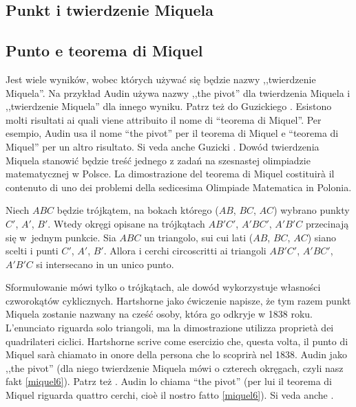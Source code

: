 
%

\subsection{Punkt i twierdzenie Miquela} %
\subsection{Punto e teorema di Miquel} %

Jest wiele wyników, wobec których używać się będzie nazwy ,,twierdzenie Miquela''. %
Na przykład Audin \cite[s. 104]{audin_2003} używa nazwy ,,the pivot'' dla twierdzenia Miquela i ,,twierdzenie Miquela'' dla innego wyniku. %
Patrz też do Guzickiego \cite[s. 29, 32]{guzicki_2021}. %
Esistono molti risultati ai quali viene attribuito il nome di ``teorema di Miquel''. %
Per esempio, Audin \cite[s. 104]{audin_2003} usa il nome “the pivot” per il teorema di Miquel e “teorema di Miquel” per un altro risultato. %
Si veda anche Guzicki \cite[p. 29, 32]{guzicki_2021}. %
%
Dowód twierdzenia Miquela stanowić będzie treść jednego z zadań na szesnastej olimpiadzie matematycznej w Polsce.%
La dimostrazione del teorema di Miquel costituirà il contenuto di uno dei problemi della sedicesima Olimpiade Matematica in Polonia.%

\begin{proposition}
[twierdzenie Miquela] %
[teorema di Miquel] %
%
Niech $ABC$ będzie trójkątem, na bokach którego ($AB$, $BC$, $AC$) wybrano punkty $C'$, $A'$, $B'$. %
Wtedy okręgi opisane na trójkątach $AB'C'$, $A'BC'$, $A'B'C$ przecinają się w~jednym punkcie. %
Sia $ABC$ un triangolo, sui cui lati ($AB$, $BC$, $AC$) siano scelti i punti $C'$, $A'$, $B'$. %
Allora i cerchi circoscritti ai triangoli $AB'C'$, $A'BC'$, $A'B'C$ si intersecano in un unico punto. %
\end{proposition}

Sformułowanie mówi tylko o trójkątach, ale dowód wykorzystuje własności czworokątów cyklicznych. %
Hartshorne \cite[s. 61]{hartshorne_2000} jako ćwiczenie napisze, że tym razem punkt Miquela zostanie nazwany na cześć osoby, która go odkryje w 1838 roku. %
L'enunciato riguarda solo triangoli, ma la dimostrazione utilizza proprietà dei quadrilateri ciclici. %
Hartshorne \cite[p. 61]{hartshorne_2000} scrive come esercizio che, questa volta, il punto di Miquel sarà chiamato in onore della persona che lo scoprirà nel 1838. %
%
Audin \cite[s. 104]{audin_2003} jako ,,the pivot'' (dla niego twierdzenie Miquela mówi o czterech okręgach, czyli nasz fakt \ref{miquel6}). %
Patrz też \cite[s. 11]{komisarczyk_2024}. %
Audin \cite[p. 104]{audin_2003} lo chiama ``the pivot'' (per lui il teorema di Miquel riguarda quattro cerchi, cioè il nostro fatto \ref{miquel6}). %
Si veda anche \cite[p. 11]{komisarczyk_2024}. %

